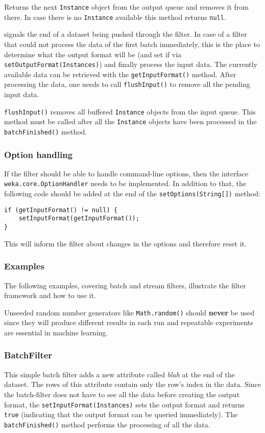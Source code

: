 Returns the next \texttt{Instance} object from the output queue and removes it
from there. In case there is no \texttt{Instance} available this method returns
\texttt{null}.

\newpage
{} signals the end of a dataset being pushed
through the filter. In case of a filter that could not process the data of the
first batch immediately, this is the place to determine what the output format
will be (and set if via \texttt{setOutputFormat(Instances)}) and finally process
the input data. The currently available data can be retrieved with the
\texttt{getInputFormat()} method. After processing the data, one needs to call
\texttt{flushInput()} to remove all the pending input data.

\texttt{flushInput()} removes all buffered \texttt{Instance} objects from the
input queue. This method must be called after all the \texttt{Instance} objects
have been processed in the \texttt{batchFinished()} method.

\subsubsection*{Option handling}
\label{filter_optionhandling}
If the filter should be able to handle command-line options, then the interface
\texttt{weka.core.OptionHandler} needs to be implemented. In addition
to that, the following code should be added at the end of the
\texttt{setOptions(String[])} method:
\begin{verbatim}
if (getInputFormat() != null) {
    setInputFormat(getInputFormat());
}
\end{verbatim}
This will inform the filter about changes in the options and therefore reset it.

\newpage
\subsubsection{Examples}
The following examples, covering batch and stream filters, illustrate the
filter framework and how to use it.

Unseeded random number generators like \texttt{Math.random()} should
\textbf{never} be used since they will produce different results in each run and
repeatable experiments are essential in machine learning.

\subsubsection*{BatchFilter}
This simple batch filter adds a new attribute called \textit{blah} at the end of
the dataset. The rows of this attribute contain only the row's index in the
data. Since the batch-filter does not have to see all the data before creating
the output format, the \texttt{setInputFormat(Instances)} sets the output format
and returns \texttt{true} (indicating that the output format can be queried
immediately). The \texttt{batchFinished()} method performs the processing of all
the data.

